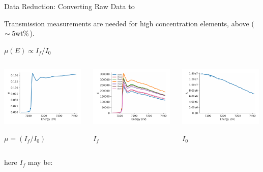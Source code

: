 \begin{slide}{Data Reduction: Converting Raw Data to  {\mue}  }
\begin{cenpage}{145mm}
{{  Transmission measurements are needed for high concentration elements, above
  ($\sim 5 {\rm wt \%}$).
         


   }}
 
 { {
    
    {}   $ \mu(E) \propto I_f / I_0 $ 
    
    \vmm
    \begin{columns}
      \begin{column}{40mm}
        \includegraphics[width=40mm]{figs/experiment/mu_fluor}
        
        \hspace{15mm}        $\mu = (I_f/I_0)$
      \end{column}
      \begin{column}{40mm}         
        \includegraphics[width=40mm]{figs/experiment/if_multi}
        
        \hspace{15mm}        $I_f$
      \end{column}
      \begin{column}{40mm}                  
        \includegraphics[width=40mm]{figs/experiment/i0_fluor}
        
        \hspace{15mm}        $I_0$
       \end{column}
     \end{columns}

 \vmm\vmm

 
 here $I_f$ may be:
 
}}
\end{cenpage}
\end{slide}
